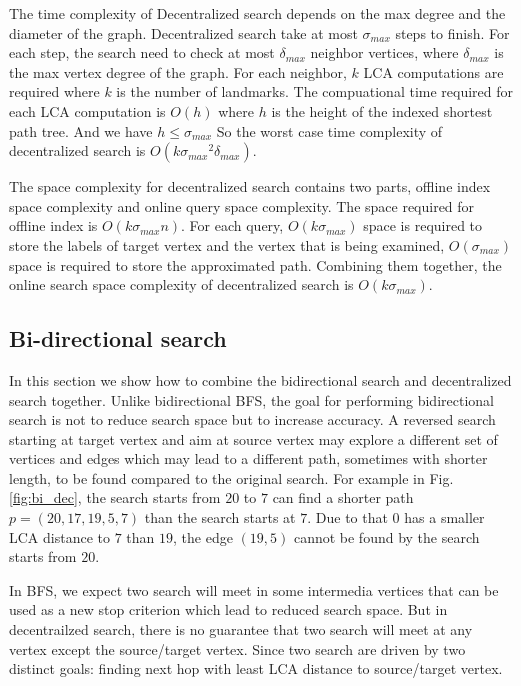 The time complexity of Decentralized search depends on the max degree and the diameter of the graph. Decentralized search take at most ${\sigma}_{max}$ steps to finish. For each step, the search need to check at most ${\delta}_{max}$ neighbor vertices, where ${\delta}_{max}$ is the max vertex degree of the graph. For each neighbor, $k$ LCA computations are required where $k$ is the number of landmarks. The compuational time required for each LCA computation is $O(h)$ where $h$ is the height of the indexed shortest path tree. And we have $h \leq {\sigma}_{max}$ So the worst case time complexity of decentralized search is $O(k{{\sigma}_{max}}^2{\delta}_{max})$. 

The space complexity for decentralized search contains two parts, offline index space complexity and online query space complexity. The space required for offline index is $O(k{\sigma}_{max}n)$. For each query, $O(k{\sigma}_{max})$ space is required to store the labels of target vertex and the vertex that is being examined, $O({\sigma}_{max})$ space is required to store the approximated path. Combining them together, the online search space complexity of decentralized search is $O(k{\sigma}_{max})$.

\subsection{Bi-directional search}

In this section we show how to combine the bidirectional search and decentralized search together. Unlike bidirectional BFS, the goal for performing bidirectional search is not to reduce search space but to increase accuracy. A reversed search starting at target vertex and aim at source vertex may explore a different set of vertices and edges which may lead to a different path, sometimes with shorter length, to be found compared to the original search. For example in Fig. \ref{fig:bi_dec}, the search starts from $20$ to $7$ can find a shorter path $p = (20, 17, 19, 5, 7)$ than the search starts at $7$. Due to that $0$ has a smaller LCA distance to $7$ than $19$, the edge $(19, 5)$ cannot be found by the search starts from $20$. 

In BFS, we expect two search will meet in some intermedia vertices that can be used as a new stop criterion which lead to reduced search space. But in decentrailzed search, there is no guarantee that two search will meet at any vertex except the source/target vertex. Since two search are driven by two distinct goals: finding next hop with least LCA distance to source/target vertex. 

